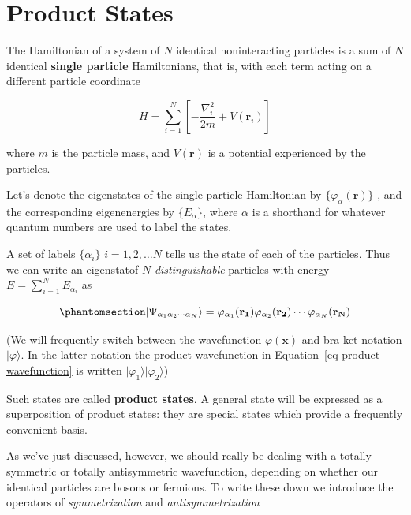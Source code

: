 \documentclass[
  letterpaper,
  DIV=11,
  numbers=noendperiod]{scrreprt}
\begin{document}
\section{Product States}\label{product-states}

The Hamiltonian of a system of \(N\) identical noninteracting particles
is a sum of \(N\) identical \textbf{single particle} Hamiltonians, that
is, with each term acting on a different particle coordinate

\[
 H = \sum_{i=1}^{N} \left[-\frac{\nabla_i^{2}}{2m}+V(\mathbf{r}_i)\right]
 \label{quantum_statistics_SPHamiltonian}
\]

where \(m\) is the particle mass, and \(V(\mathbf{r})\) is a potential
experienced by the particles.

Let's denote the eigenstates of the single particle Hamiltonian by
\(\{\varphi_\alpha(\mathbf{r})\}\) , and the corresponding eigenenergies
by \(\{E_\alpha\}\), where \(\alpha\) is a shorthand for whatever
quantum numbers are used to label the states.

A set of labels \(\{\alpha_{i}\}\) \(i=1,2,\ldots N\) tells us the state
of each of the particles. Thus we can write an eigenstat\ale of \(N\)
\emph{distinguishable} particles with energy
\(E=\sum_{i=1}^{N}E_{\alpha_{i}}\) as

\begin{equation}\phantomsection\label{eq-distinguishable}{
\lvert{\Psi_{\alpha_{1}\alpha_{2}\cdots \alpha_{N}}}\rangle=\varphi_{\alpha_{1}}(\mathbf{r_{1}})\varphi_{\alpha_{2}}(\mathbf{r_{2}})\cdots\varphi_{\alpha_{N}}(\mathbf{r_{N}})
}\end{equation}

(We will frequently switch between the wavefunction
\(\varphi(\mathbf{x})\) and bra-ket notation \(\lvert{\varphi}\rangle\).
In the latter notation the product wavefunction in
Equation~\ref{eq-product-wavefunction} is written
\(\lvert{\varphi_{1}}\rangle\lvert{\varphi_{2}}\rangle\))

Such states are called \textbf{product states}. A general state will be
expressed as a superposition of product states: they are special states
which provide a frequently convenient basis.

As we've just discussed, however, we should really be dealing with a
totally symmetric or totally antisymmetric wavefunction, depending on
whether our identical particles are bosons or fermions. To write these
down we introduce the operators of \emph{symmetrization} and
\emph{antisymmetrization}
\end{document}
